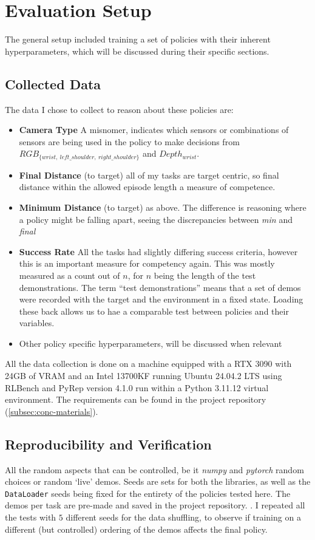 \section{Evaluation Setup}
The general setup included training a set of policies with their inherent hyperparameters, which will be discussed during their specific sections.

\subsection{Collected Data}
The data I chose to collect to reason about these policies are:
\begin{itemize}
  \item \textbf{Camera Type} A misnomer, indicates which sensors or combinations of sensors are being used in the policy to make decisions from \({RGB}_{ \{wrist, ~left\_shoulder, ~right\_shoulder \} }\) and \(Depth_{wrist}\).
  \item \textbf{Final Distance} (to target) all of my tasks are target centric, so final distance within the allowed episode length a measure of competence.
  \item \textbf{Minimum Distance} (to target) as above. The difference is reasoning where a policy might be falling apart, seeing the discrepancies between \emph{min} and \emph{final}
  \item \textbf{Success Rate} All the tasks had slightly differing success criteria, however this is an important measure for competency again. This was mostly measured as a count out of $n$, for $n$ being the length of the test demonstrations. The term ``test demonstrations'' means that a set of demos were recorded with the target and the environment in a fixed state. Loading these back allows us to hae a comparable test between policies and their variables.
  \item Other policy specific hyperparameters, will be discussed when relevant
\end{itemize}

All the data collection is done on a machine equipped with a RTX 3090 with 24GB of VRAM and an Intel 13700KF running Ubuntu 24.04.2 LTS using RLBench and PyRep version 4.1.0 run within a Python 3.11.12 virtual environment. The requirements can be found in the project repository (\ref{subsec:conc-materials}).

\subsection{Reproducibility and Verification}
All the random aspects that can be controlled, be it \emph{numpy} and \emph{pytorch} random choices or random `live' demos. Seeds are sets for both the libraries, as well as the \verb|DataLoader| seeds being fixed for the entirety of the policies tested here.
The demos per task are pre-made and saved in the project repository. . I repeated all the tests with $5$ different seeds for the data shuffling, to observe if training on a different (but controlled) ordering of the demos affects the final policy.


